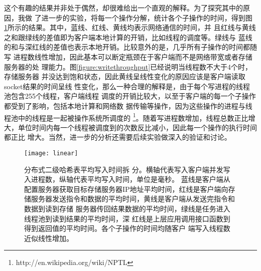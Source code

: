 这个有趣的结果并非处于偶然，却很难给出一个直观的解释。为了探究其中的原因，我做
了进一步的实验，将每一个操作分解，统计各个子操作的时间，得到图
\ref{figure:linear}所示的结果。其中，蓝线、红线、黄线均表示网络通信的时间，并
且红线与黄线之和跟绿线的差值即为客户端本地计算的开销，比如线程的调度等。绿线与
蓝线的和与深红线的差值也表示本地开销。比较意外的是，几乎所有子操作的时间都随写
进程数线性增加，因此基本可以断定瓶颈在于客户端而不是网络带宽或者存储服务器的处
理能力。图\ref{figure:writethroughput}已经说明当线程数不大于4个时，存储服务器
并没达到饱和状态，因此黄线呈线性变化的原因应该是客户端读取socket结果的时间呈线
性变化，那么一种合理的解释是，由于每个写进程的线程池包含255个线程，客户端线程
调度的开销比较大，以至于客户端的每一个子操作都受到了影响，包括本地计算和网络数
据传输等操作，因为这些操作的进程与线程池中的线程是一起被操作系统所调度的
\footnote{http://en.wikipedia.org/wiki/NPTL}。随着写进程数增加，线程总数正比增
大，单位时间内每一个线程被调度到的次数反比减小，因此每一个操作的执行时间都正比
增大。当然，进一步的分析还需要后续实验做深入的验证和讨论。
\begin{figure}[htb]
  \centering
  \texttt{[image: linear]}
  \caption[分布式二级哈希表平均写入时间拆分]{分布式二级哈希表平均写入时间拆
  分。横轴代表写入客户端并发写入进程数，纵轴代表平均写入时间，单位是毫秒。
  蓝线是客户端从配置服务器获取目标存储服务器IP地址平均时间，红线是客户端向存
  储服务器发送指令和数据的平均时间，黄线是客户端从发送完指令和数据到读到存储
  服务器传回结果数据的平均时间，绿线是任务进入线程池到读到结果的平均时间，深
  红线是上层应用调用接口函数到得到返回值的平均时间。各个子操作的时间均随客户
  端写入线程数近似线性增加。}
  \label{figure:linear}
\end{figure}
